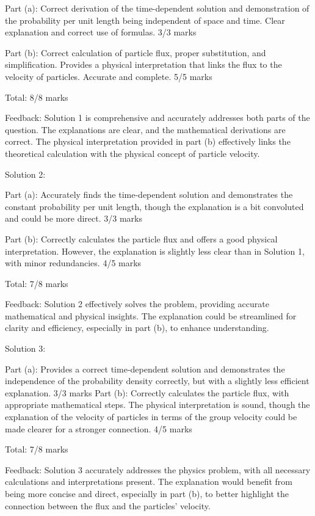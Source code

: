 \documentclass[a4paper,11pt]{article}
\begin{document}
Part (a): Correct derivation of the time-dependent solution and demonstration of the probability per unit length being independent of space and time. Clear explanation and correct use of formulas. 3/3 marks

Part (b): Correct calculation of particle flux, proper substitution, and simplification. Provides a physical interpretation that links the flux to the velocity of particles. Accurate and complete. 5/5 marks

Total: 8/8 marks

Feedback: Solution 1 is comprehensive and accurately addresses both parts of the question. The explanations are clear, and the mathematical derivations are correct. The physical interpretation provided in part (b) effectively links the theoretical calculation with the physical concept of particle velocity.

Solution 2:

Part (a): Accurately finds the time-dependent solution and demonstrates the constant probability per unit length, though the explanation is a bit convoluted and could be more direct. 3/3 marks

Part (b): Correctly calculates the particle flux and offers a good physical interpretation. However, the explanation is slightly less clear than in Solution 1, with minor redundancies. 4/5 marks

Total: 7/8 marks

Feedback: Solution 2 effectively solves the problem, providing accurate mathematical and physical insights. The explanation could be streamlined for clarity and efficiency, especially in part (b), to enhance understanding.

Solution 3:

Part (a): Provides a correct time-dependent solution and demonstrates the independence of the probability density correctly, but with a slightly less efficient explanation. 3/3 marks
Part (b): Correctly calculates the particle flux, with appropriate mathematical steps. The physical interpretation is sound, though the explanation of the velocity of particles in terms of the group velocity could be made clearer for a stronger connection. 4/5 marks

Total: 7/8 marks

Feedback: Solution 3 accurately addresses the physics problem, with all necessary calculations and interpretations present. The explanation would benefit from being more concise and direct, especially in part (b), to better highlight the connection between the flux and the particles' velocity.
\end{document}
